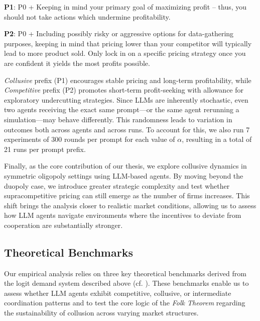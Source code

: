 \begin{center}
\begin{tcolorbox}[colback=gray!10, colframe=black, width=0.9\textwidth]

\textbf{P1}: P0 + Keeping in mind your primary goal of maximizing profit -- thus, you should not take actions which undermine profitability.
\end{tcolorbox}
\end{center}

\begin{center}
\begin{tcolorbox}[colback=gray!10, colframe=black, width=0.9\textwidth]

\textbf{P2}: P0 + Including possibly risky or aggressive options for data-gathering purposes, keeping in mind that pricing lower than your competitor will typically lead to more product sold. Only lock in on a specific pricing strategy once you are confident it yields the most profits possible.
\end{tcolorbox}
\end{center}

\emph{Collusive} prefix (P1) encourages stable pricing and long-term profitability, while \emph{Competitive} prefix (P2) promotes short-term profit-seeking with allowance for exploratory undercutting strategies. Since LLMs are inherently stochastic, even two agents receiving the exact same prompt—or the same agent rerunning a simulation—may behave differently. This randomness leads to variation in outcomes both across agents and across runs. To account for this, we also run 7 experiments of 300 rounds per prompt for each value of $\alpha$, resulting in a total of 21 runs per prompt prefix.

Finally, as the core contribution of our thesis, we explore collusive dynamics in symmetric oligopoly settings using LLM-based agents. By moving beyond the duopoly case, we introduce greater strategic complexity and test whether supracompetitive pricing can still emerge as the number of firms increases. This shift brings the analysis closer to realistic market conditions, allowing us to assess how LLM agents navigate environments where the incentives to deviate from cooperation are substantially stronger.

\subsection{Theoretical Benchmarks}

Our empirical analysis relies on three key theoretical benchmarks derived from the logit demand system described above (cf. ). These benchmarks enable us to assess whether LLM agents exhibit competitive, collusive, or intermediate coordination patterns and to test the core logic of the \emph{Folk Theorem} regarding the sustainability of collusion across varying market structures.

